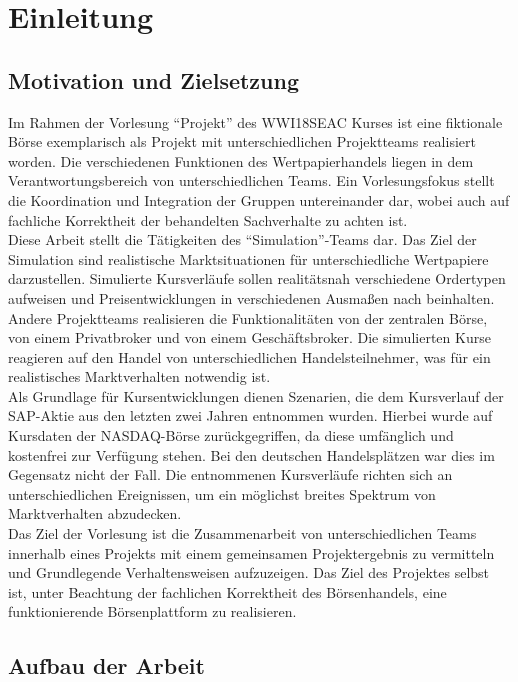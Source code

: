 \chapter{Einleitung}
\section{Motivation und Zielsetzung}

	
	Im Rahmen der Vorlesung \enquote{Projekt} des WWI18SEAC Kurses ist eine fiktionale Börse exemplarisch als Projekt mit unterschiedlichen Projektteams realisiert worden. Die verschiedenen Funktionen des Wertpapierhandels liegen in dem Verantwortungsbereich von unterschiedlichen Teams. Ein Vorlesungsfokus stellt die Koordination und Integration der Gruppen untereinander dar, wobei auch auf fachliche Korrektheit der behandelten Sachverhalte zu achten ist.\\
	Diese Arbeit stellt die Tätigkeiten des \enquote{Simulation}-Teams dar. Das Ziel der Simulation sind realistische Marktsituationen für unterschiedliche Wertpapiere darzustellen. Simulierte Kursverläufe sollen realitätsnah verschiedene Ordertypen aufweisen und Preisentwicklungen in verschiedenen Ausmaßen nach beinhalten. \\
	Andere Projektteams realisieren die Funktionalitäten von der zentralen Börse, von einem Privatbroker und von einem Geschäftsbroker. Die simulierten Kurse reagieren auf den Handel von unterschiedlichen Handelsteilnehmer, was für ein realistisches Marktverhalten notwendig ist.\\
	Als Grundlage für Kursentwicklungen dienen Szenarien, die dem Kursverlauf der SAP-Aktie aus den letzten zwei Jahren entnommen wurden. Hierbei wurde auf Kursdaten der NASDAQ-Börse zurückgegriffen, da diese umfänglich und kostenfrei zur Verfügung stehen. Bei den deutschen Handelsplätzen war dies im Gegensatz nicht der Fall. Die entnommenen Kursverläufe richten sich an unterschiedlichen Ereignissen, um ein möglichst breites Spektrum von Marktverhalten abzudecken.\\
	Das Ziel der Vorlesung ist die Zusammenarbeit von unterschiedlichen Teams innerhalb eines Projekts mit einem gemeinsamen Projektergebnis zu vermitteln und Grundlegende Verhaltensweisen aufzuzeigen. Das Ziel des Projektes selbst ist, unter Beachtung der fachlichen Korrektheit des Börsenhandels, eine funktionierende Börsenplattform zu realisieren.


\section{Aufbau der Arbeit}

